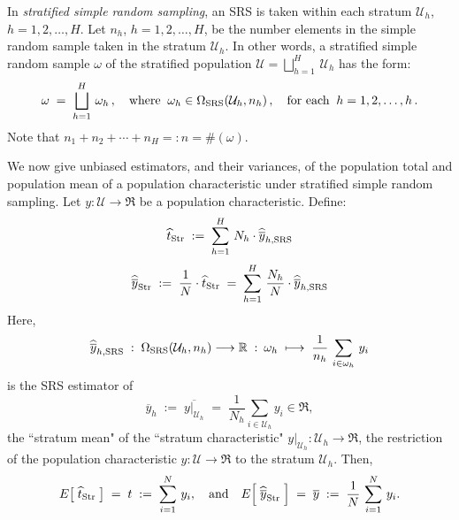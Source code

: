 \documentclass{article}
\begin{document}
In \emph{stratified simple random sampling}, an SRS is taken within each stratum $\mathcal{U}_{h}$, $h=1,2,\ldots,H$.
Let $n_{h}$, $h = 1,2,\ldots,H$, be the number elements in the simple random sample taken in the stratum $\mathcal{U}_{h}$.
In other words, a stratified simple random sample $\omega$ of the stratified population $\mathcal{U} = \bigsqcup_{h=1}^{H}\,\mathcal{U}_{h}$ has the form:
\begin{equation*}
     \omega \; = \; \bigsqcup_{h=1}^{H}\,\omega_{h}\,,
     \quad\textnormal{where}\;\; \omega_{h} \in \Omega_{\textnormal{SRS}}(\mathcal{U}_{h},n_{h})\,,
     \quad\textnormal{for each}\;\; h = 1,2,\ldots,h\,.
\end{equation*}
Note that $n_{1} + n_{2} + \cdots + n_{H} =: n = \#\!(\omega)$.

We now give unbiased estimators, and their variances, of the population total and population mean of a population characteristic under stratified simple random sampling.  Let $y : \mathcal{U} \longrightarrow \Re$ be a population characteristic.  Define:
\begin{equation*}
    \widehat{t}_{\textnormal{Str}} \; := \; 
    \sum^{H}_{h=1}\, N_{h}\cdot\widehat{\overline{y}}_{h,\textnormal{SRS}}
\end{equation*}
\begin{equation*}
              \widehat{\overline{y}}_{\textnormal{Str}}
    \; := \; \dfrac{1}{N}\cdot\widehat{t}_{\textnormal{Str}}
    \;  = \; \sum^{H}_{h=1}\, \dfrac{N_{h}}{N}\cdot\widehat{\overline{y}}_{h,\textnormal{SRS}}
\end{equation*}
Here,
\begin{equation*}
    \widehat{\overline{y}}_{h,\textnormal{SRS}} \; : \; \Omega_{\textnormal{SRS}}(\mathcal{U}_{h},n_{h}) \longrightarrow \Re
    \; : \: \omega_{h} \; \longmapsto \; \dfrac{1}{n_{h}}\,\sum_{i\in\omega_{h}}\,y_{i}
\end{equation*}
is the SRS estimator of
\begin{equation*}
    \overline{y}_{h} \; := \; \overline{y|_{\mathcal{U}_{h}}} \; = \; \dfrac{1}{N_{h}} \sum_{i\in\mathcal{U}_{h}} y_{i} \in \Re,
\end{equation*}
the ``stratum mean" of the ``stratum characteristic" $y|_{\mathcal{U}_{h}} : \mathcal{U}_{h} \longrightarrow \Re$, the restriction of the population characteristic $y : \mathcal{U} \longrightarrow \Re$ to the stratum $\mathcal{U}_{h}$.  Then,
\begin{equation*}
    E\!\left[\;\widehat{t}_{\textnormal{Str}}\;\right] \; = \; t \; := \; \sum^{N}_{i=1}\,y_{i},
    \quad\textnormal{and}\quad
    E\!\left[\;\widehat{\overline{y}}_{\textnormal{Str}}\;\right] \; = \; \overline{y} \; := \; \dfrac{1}{N}\,\sum^{N}_{i=1}\,y_{i}.
\end{equation*}
\end{document}

